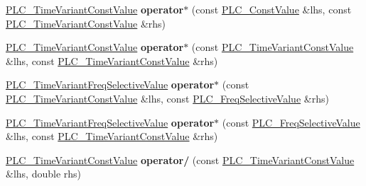 \begin{DoxyCompactItemize}
\item 
\hypertarget{classns3_1_1PLC__TimeVariantConstValue_a2b69e436f62b79948cd6b8e2dd74baf5}{\hyperlink{classns3_1_1PLC__TimeVariantConstValue}{\-P\-L\-C\-\_\-\-Time\-Variant\-Const\-Value} {\bfseries operator$\ast$} (const \hyperlink{classns3_1_1PLC__ConstValue}{\-P\-L\-C\-\_\-\-Const\-Value} \&lhs, const \hyperlink{classns3_1_1PLC__TimeVariantConstValue}{\-P\-L\-C\-\_\-\-Time\-Variant\-Const\-Value} \&rhs)}\label{classns3_1_1PLC__TimeVariantConstValue_a2b69e436f62b79948cd6b8e2dd74baf5}

\item 
\hypertarget{classns3_1_1PLC__TimeVariantConstValue_a61b5f2cc10217f4c4b37ec2624892dfa}{\hyperlink{classns3_1_1PLC__TimeVariantConstValue}{\-P\-L\-C\-\_\-\-Time\-Variant\-Const\-Value} {\bfseries operator$\ast$} (const \hyperlink{classns3_1_1PLC__TimeVariantConstValue}{\-P\-L\-C\-\_\-\-Time\-Variant\-Const\-Value} \&lhs, const \hyperlink{classns3_1_1PLC__TimeVariantConstValue}{\-P\-L\-C\-\_\-\-Time\-Variant\-Const\-Value} \&rhs)}\label{classns3_1_1PLC__TimeVariantConstValue_a61b5f2cc10217f4c4b37ec2624892dfa}

\item 
\hypertarget{classns3_1_1PLC__TimeVariantConstValue_a98a7967618d0d619603a8af279eb8919}{\hyperlink{classns3_1_1PLC__TimeVariantFreqSelectiveValue}{\-P\-L\-C\-\_\-\-Time\-Variant\-Freq\-Selective\-Value} {\bfseries operator$\ast$} (const \hyperlink{classns3_1_1PLC__TimeVariantConstValue}{\-P\-L\-C\-\_\-\-Time\-Variant\-Const\-Value} \&lhs, const \hyperlink{classns3_1_1PLC__FreqSelectiveValue}{\-P\-L\-C\-\_\-\-Freq\-Selective\-Value} \&rhs)}\label{classns3_1_1PLC__TimeVariantConstValue_a98a7967618d0d619603a8af279eb8919}

\item 
\hypertarget{classns3_1_1PLC__TimeVariantConstValue_a94310ec03556c2390343a5e2239ca9cf}{\hyperlink{classns3_1_1PLC__TimeVariantFreqSelectiveValue}{\-P\-L\-C\-\_\-\-Time\-Variant\-Freq\-Selective\-Value} {\bfseries operator$\ast$} (const \hyperlink{classns3_1_1PLC__FreqSelectiveValue}{\-P\-L\-C\-\_\-\-Freq\-Selective\-Value} \&lhs, const \hyperlink{classns3_1_1PLC__TimeVariantConstValue}{\-P\-L\-C\-\_\-\-Time\-Variant\-Const\-Value} \&rhs)}\label{classns3_1_1PLC__TimeVariantConstValue_a94310ec03556c2390343a5e2239ca9cf}

\item 
\hypertarget{classns3_1_1PLC__TimeVariantConstValue_a2da6dff602ad810abfc6ad36f97a03e9}{\hyperlink{classns3_1_1PLC__TimeVariantConstValue}{\-P\-L\-C\-\_\-\-Time\-Variant\-Const\-Value} {\bfseries operator/} (const \hyperlink{classns3_1_1PLC__TimeVariantConstValue}{\-P\-L\-C\-\_\-\-Time\-Variant\-Const\-Value} \&lhs, double rhs)}\label{classns3_1_1PLC__TimeVariantConstValue_a2da6dff602ad810abfc6ad36f97a03e9}


\end{DoxyCompactItemize}
